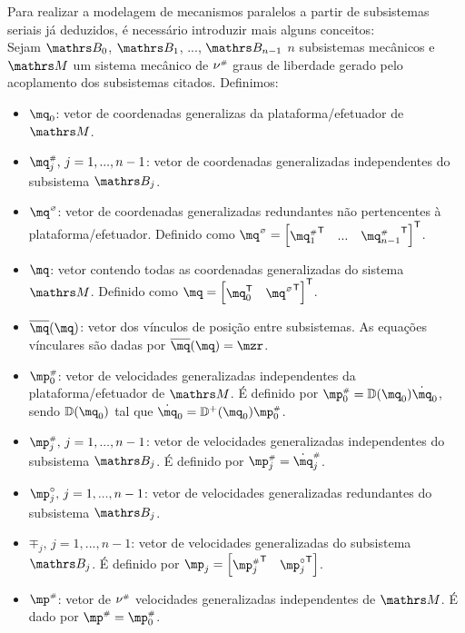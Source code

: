 \documentclass[a4paper,11pt,brazil,fleqn]{article}
\begin{document}
Para realizar a modelagem de mecanismos paralelos a partir de subsistemas seriais j\'a deduzidos, \'e necess\'ario introduzir mais alguns conceitos: \\

Sejam $\ssB_0$, $\ssB_1$, ..., $\ssB_{n-1}$ $n$ subsistemas mec\^anicos e $\ssM$ um sistema mec\^anico de $\nu^{\scriptscriptstyle \#}$ graus de liberdade gerado pelo acoplamento dos subsistemas citados. Definimos:

\begin{itemize}
\item $\mq_0$: vetor de coordenadas generalizas da plataforma/efetuador de $\ssM$.
\item $\mq_j\ssh, \,j=1, ..., n-1$: vetor de coordenadas generalizadas independentes do subsistema  $\ssB_j$.
\item $\mq\hcir$: vetor de coordenadas generalizadas redundantes n\~ao pertencentes \`a plataforma/efetuador. Definido como $\mq\hcir = \begin{bmatrix}  {\mq_1\ssh}^\msT & ... & {\mq_{n-1}\ssh}^\msT \end{bmatrix}^\msT $.
\item $\mq$: vetor contendo todas as coordenadas generalizadas do sistema $\ssM$. Definido como $\mq = \begin{bmatrix} \mq_0^\msT & {\mq\hcir}^\msT \end{bmatrix}^\msT $.
\item $\overline{\mq}(\mq)$: vetor dos v\'inculos de posi\c{c}\~ao entre subsistemas. As equa\c{c}\~oes v\'inculares s\~ao dadas por $\overline{\mq}(\mq) = \mzr $.
\item $\mp\ssh_0$: vetor de velocidades generalizadas independentes da plataforma/efetuador de $\ssM$. É definido por $\mp\ssh_0 = \mD(\mq_0)\dot{\mq}_0$, sendo $\mD(\mq_0)$ tal que $\dot{\mq}_0  = \mD^+(\mq_0) \mp\ssh_0$.
\item $\mp_j\ssh, \,j=1, ..., n-1$: vetor de velocidades generalizadas independentes do subsistema  $\ssB_j$. É definido por $\mp_j\ssh = \dot{\mq}_j\ssh$.
\item $\mp_j\cir, \,j=1, ..., n-1$: vetor de velocidades generalizadas redundantes do subsistema  $\ssB_j$.
\item $\mp_j, \,j=1, ..., n-1$: vetor de velocidades generalizadas do subsistema  $\ssB_j$. É definido por $\mp_j = \begin{bmatrix} {\mp_j\ssh}^\msT & {\mp_j\cir}^\msT \end{bmatrix}$.
\item $\mp\ssh$: vetor de $\nu^{\scriptscriptstyle \#}$ velocidades generalizadas independentes de $\ssM$. É dado por $\mp\ssh = \mp_0\ssh$.

\end{itemize}
\end{document}
